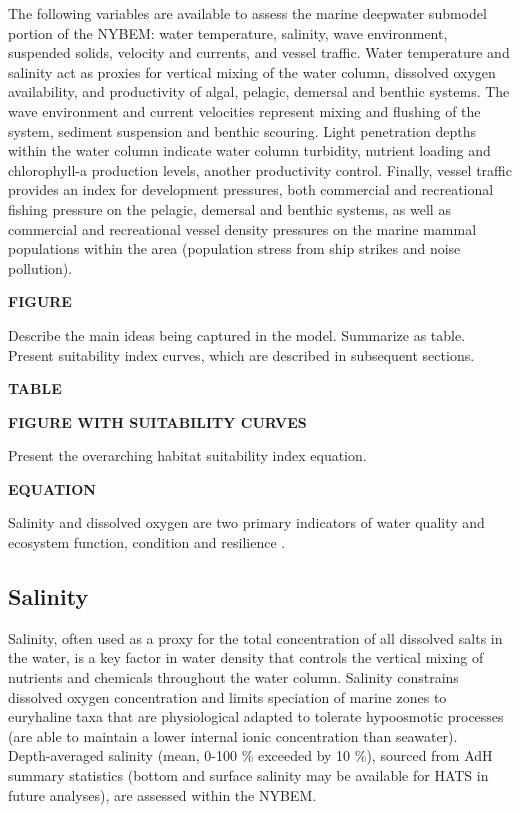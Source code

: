 \documentclass[
]{book}
\begin{document}
The following variables are available to assess the marine deepwater submodel portion of the NYBEM: water temperature, salinity, wave environment, suspended solids, velocity and currents, and vessel traffic. Water temperature and salinity act as proxies for vertical mixing of the water column, dissolved oxygen availability, and productivity of algal, pelagic, demersal and benthic systems. The wave environment and current velocities represent mixing and flushing of the system, sediment suspension and benthic scouring. Light penetration depths within the water column indicate water column turbidity, nutrient loading and chlorophyll-a production levels, another productivity control. Finally, vessel traffic provides an index for development pressures, both commercial and recreational fishing pressure on the pelagic, demersal and benthic systems, as well as commercial and recreational vessel density pressures on the marine mammal populations within the area (population stress from ship strikes and noise pollution).

\textbf{FIGURE}

Describe the main ideas being captured in the model. Summarize as table. Present suitability index curves, which are described in subsequent sections.

\textbf{TABLE}

\textbf{FIGURE WITH SUITABILITY CURVES}

Present the overarching habitat suitability index equation.

\textbf{EQUATION}

Salinity and dissolved oxygen are two primary indicators of water quality and ecosystem function, condition and resilience \citep{smit_assessing_2021}.

\hypertarget{salinity-2}{%
\subsection{Salinity}\label{salinity-2}}

Salinity, often used as a proxy for the total concentration of all dissolved salts in the water, is a key factor in water density that controls the vertical mixing of nutrients and chemicals throughout the water column. Salinity constrains dissolved oxygen concentration and limits speciation of marine zones to euryhaline taxa that are physiological adapted to tolerate hypoosmotic processes (are able to maintain a lower internal ionic concentration than seawater).\\
Depth-averaged salinity (mean, 0-100 \% exceeded by 10 \%), sourced from AdH summary statistics (bottom and surface salinity may be available for HATS in future analyses), are assessed within the NYBEM.
\end{document}
